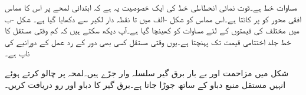 مساوات    خط ہے۔قوت نمائی انحطاطی خط کی ایک خصوصیت یہ ہے کہ ابتدائی لمحے  پر اس کا مماس افقی محور کو  پر کاٹتا ہے۔اس مماس کو شکل -الف میں  تا  نقطہ دار لکیر سے دکھایا گیا ہے۔ شکل -ب میں مختلف  کی قیمتوں کے لئے مساوات   کو کھینچا گیا ہے۔آپ دیکھ سکتے ہیں کہ کم وقتی مستقل کا خط جلد اختتامی قیمت تک پہنچتا ہے۔یوں وقتی مستقل کسی بھی دور کے رد عمل کے دورانیے کی ناپ ہے۔

شکل  میں مزاحمت اور بے بار برق گیر سلسلہ وار جڑے ہیں۔لمحہ  پر  چالو کرتے ہوئے انہیں مستقل منبع دباو  کے ساتھ جوڑا جاتا ہے۔برق گیر کا دباو  اور رو  دریافت کریں۔

